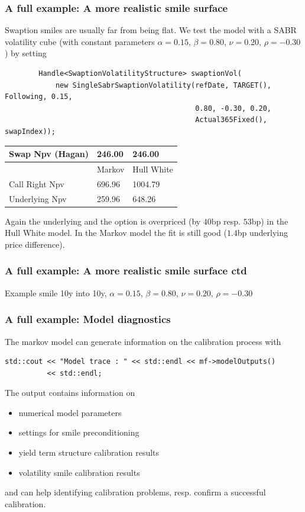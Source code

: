 \documentclass{beamer}
\begin{document}
\begin{frame}[fragile]
\frametitle{A full example: A more realistic smile surface}
Swaption smiles are usually far from being flat. We test the model with a SABR volatility cube
(with constant parameters $\alpha=0.15$, $\beta=0.80$, $\nu=0.20$, $\rho=-0.30$) by setting

\begin{verbatim}
        Handle<SwaptionVolatilityStructure> swaptionVol(
            new SingleSabrSwaptionVolatility(refDate, TARGET(), Following, 0.15,
                                             0.80, -0.30, 0.20,
                                             Actual365Fixed(), swapIndex));
\end{verbatim}

\begin{table}[ht]
\begin{tabular}{l|l|l}
Swap Npv (Hagan) & 246.00 & 246.00\\ \hline
 & Markov & Hull White \\ \hline
Call Right Npv   & 696.96 & 1004.79 \\
Underlying Npv   & 259.96 & 648.26 \\
\end{tabular}
\end{table}

Again the underlying and the option is overpriced (by $40$bp resp. $53$bp) in the Hull White model.
In the Markov model the fit is still good ($1.4$bp underlying price difference).
\end{frame}


\begin{frame}[fragile]
\frametitle{A full example: A more realistic smile surface ctd}

Example smile 10y into 10y, $\alpha=0.15$, $\beta=0.80$, $\nu=0.20$, $\rho=-0.30$

\end{frame}

\begin{frame}[fragile]
\frametitle{A full example: Model diagnostics}
The markov model can generate information on the calibration process with
\begin{verbatim}
std::cout << "Model trace : " << std::endl << mf->modelOutputs() 
          << std::endl;
\end{verbatim}
The output contains information on
\begin{itemize}
\item numerical model parameters
\item settings for smile preconditioning
\item yield term structure calibration results
\item volatility smile calibration results
\end{itemize}
and can help identifying calibration problems, resp. confirm a successful calibration.
\end{frame}
\end{document}
